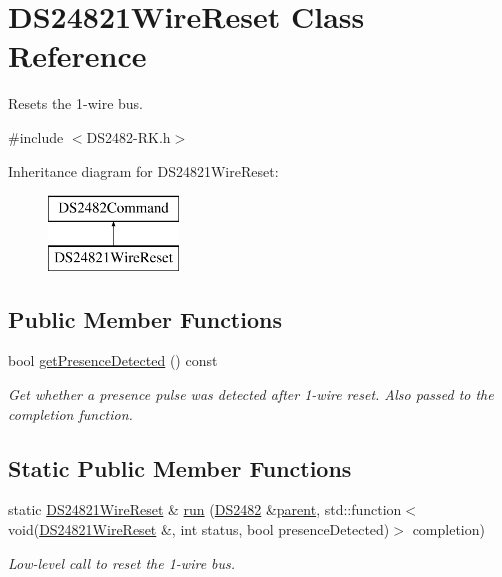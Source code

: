 \hypertarget{class_d_s24821_wire_reset}{}\section{D\+S24821\+Wire\+Reset Class Reference}
\label{class_d_s24821_wire_reset}


Resets the 1-\/wire bus.  




{\ttfamily \#include $<$D\+S2482-\/\+R\+K.\+h$>$}

Inheritance diagram for D\+S24821\+Wire\+Reset\+:\begin{figure}[H]
\begin{center}
\leavevmode
\includegraphics[height=2.000000cm]{class_d_s24821_wire_reset}
\end{center}
\end{figure}
\subsection*{Public Member Functions}
\begin{DoxyCompactItemize}
\item 
\mbox{\label{class_d_s24821_wire_reset_a79cb9f726fce17b4ff23a4df739ede3b}} 
bool \mbox{\hyperlink{class_d_s24821_wire_reset_a79cb9f726fce17b4ff23a4df739ede3b}{get\+Presence\+Detected}} () const
\begin{DoxyCompactList}\small\item\em Get whether a presence pulse was detected after 1-\/wire reset. Also passed to the completion function. \end{DoxyCompactList}\end{DoxyCompactItemize}
\subsection*{Static Public Member Functions}
\begin{DoxyCompactItemize}
\item 
\mbox{\label{class_d_s24821_wire_reset_a39a32211363709147a294fb61a323034}} 
static \mbox{\hyperlink{class_d_s24821_wire_reset}{D\+S24821\+Wire\+Reset}} \& \mbox{\hyperlink{class_d_s24821_wire_reset_a39a32211363709147a294fb61a323034}{run}} (\mbox{\hyperlink{class_d_s2482}{D\+S2482}} \&\mbox{\hyperlink{class_d_s2482_command_a54a41fb8a610ef2077f5e5377771aaf3}{parent}}, std\+::function$<$ void(\mbox{\hyperlink{class_d_s24821_wire_reset}{D\+S24821\+Wire\+Reset}} \&, int status, bool presence\+Detected)$>$ completion)
\begin{DoxyCompactList}\small\item\em Low-\/level call to reset the 1-\/wire bus. \end{DoxyCompactList}\end{DoxyCompactItemize}
